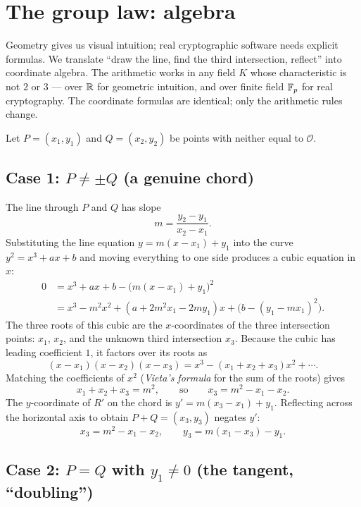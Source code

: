 \section{The group law: algebra}
\label{ch21:grouplaw-alg}

Geometry gives us visual intuition; real cryptographic software needs explicit formulas.
We translate ``draw the line, find the third intersection, reflect'' into coordinate
algebra. The arithmetic works in any field $K$ whose characteristic is not $2$ or $3$ ---
over $\mathbb{R}$ for geometric intuition, and over finite field $\mathbb{F}_p$ for real cryptography.
The coordinate formulas are identical; only the arithmetic rules change.

Let $P=(x_1,y_1)$ and $Q=(x_2,y_2)$ be points with neither equal to $\mathcal{O}$.

\subsection*{Case 1: $P \neq \pm Q$ (a genuine chord)}

The line through $P$ and $Q$ has slope
\[
m = \frac{y_2 - y_1}{x_2 - x_1}.
\]
Substituting the line equation $y = m(x-x_1)+y_1$ into the curve $y^2 = x^3+ax+b$ and
moving everything to one side produces a cubic equation in $x$:
\begin{align*}
0 &= x^3 + ax + b - \bigl(m(x - x_1) + y_1\bigr)^2 \\
  &= x^3 - m^2 x^2 + (a + 2m^2 x_1 - 2m y_1)x + \bigl(b - (y_1 - m x_1)^2\bigr).
\end{align*}
The three roots of this cubic are the $x$-coordinates of the three intersection points:
$x_1$, $x_2$, and the unknown third intersection $x_3$. Because the cubic has leading
coefficient $1$, it factors over its roots as
\[
(x - x_1)(x - x_2)(x - x_3) = x^3 - (x_1 + x_2 + x_3)x^2 + \cdots.
\]
Matching the coefficients of $x^2$ (\emph{Vieta's formula} for the sum of the roots) gives
\[
x_1 + x_2 + x_3 = m^2, \qquad\text{so}\qquad x_3 = m^2 - x_1 - x_2.
\]
The $y$-coordinate of $R'$ on the chord is $y' = m(x_3 - x_1) + y_1$. Reflecting across
the horizontal axis to obtain $P + Q = (x_3, y_3)$ negates $y'$:
\begin{equation}
\label{ch21:add-x}
x_3 = m^2 - x_1 - x_2, \qquad y_3 = m(x_1 - x_3) - y_1.
\end{equation}

\subsection*{Case 2: $P = Q$ with $y_1 \neq 0$ (the tangent, ``doubling'')}

